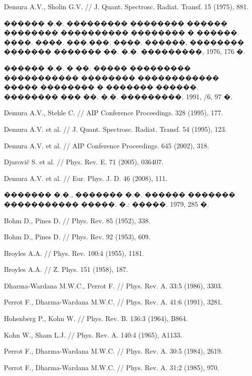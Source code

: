 \documentclass[12pt,titlepage]{article}
\newcommand{\No}{\textnumero}
\begin{document}
\begin{thebibliography}{99}
 Demura A.V., Sholin G.V. // J. Quant. Spectrosc. Radiat. Transf. 15 (1975), 881.

  ������ �.�. ��������� �������� ������ �������� ���������� �������� � ������. ����. ����. ���.���. ����. ������, �������� ������� ������� ��. �.�. ���������, 1976, 176 �.

 ������ �.�. � ��. ����� ��������� ����������� �������� ������������ ����� �������� � ������� ������. �������� ��� ��. �.�. ���������. 1991, \No 5349/6, 97 �.

 Demura A.V., Stehle C. // AIP Conference Proceedings. 328 (1995), 177.

 Demura A.V. et al. // J. Quant. Spectrosc. Radiat. Transf. 54 (1995), 123.

 Demura A.V. et al. // AIP Conference Proceedings. 645 (2002), 318.

 Djurovi\v{c} S. et al. // Phys. Rev. E. 71 (2005), 036407.

 Demura A.V. et al. // Eur. Phys. J. D. 46 (2008), 111.

 ������� �.�., ������� �.�. ������ ������� ����������� �����. �.: �����. 1979, 285 �.

 Bohm D., Pines D. // Phys. Rev. 85 (1952), 338.

 Bohm D., Pines D. // Phys. Rev. 92 (1953), 609.

 Broyles A.A. // Phys. Rev. 100:4 (1955), 1181.

 Broyles A.A. // Z. Phys. 151 (1958), 187.

 Dharma-Wardana M.W.C., Perrot F. // Phys. Rev. A. 33:5 (1986), 3303.

 Perrot F., Dharma-Wardana M.W.C. // Phys. Rev. A. 41:6 (1991), 3281.

 Hohenberg P., Kohn W. // Phys. Rev. B. 136:3 (1964), B864.

 Kohn W., Sham L.J. // Phys. Rev. A.  140:4 (1965), A1133.

 Perrot F., Dharma-Wardana M.W.C. // Phys. Rev. A. 30:5 (1984),  2619.

 Perrot F., Dharma-Wardana M.W.C. // Phys. Rev. A. 31:2 (1985), 970.


\end{thebibliography}
\end{document}
